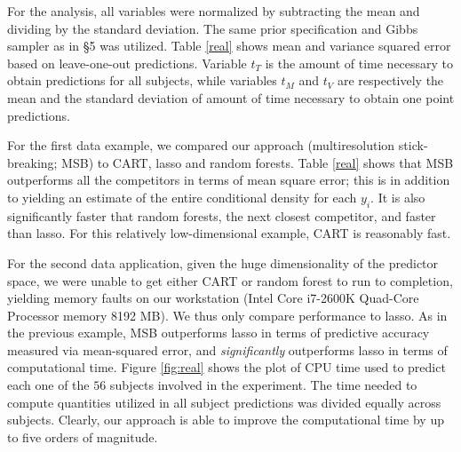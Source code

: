 \documentclass{article}
\begin{document}
For the analysis, all variables were normalized by subtracting the mean and dividing by the standard deviation. The same prior specification and Gibbs sampler as in \S 5 was  utilized. Table \ref{real} shows mean and variance squared error based on leave-one-out predictions. Variable $t_{T}$ is the amount of time necessary to obtain predictions for all subjects, while variables $t_M$ and $t_V$ are respectively the mean and the standard deviation of amount of time necessary to obtain one point predictions.

For the first data example, we compared our approach (multiresolution stick-breaking; MSB) to CART, lasso and random forests. 
Table \ref{real} shows that MSB outperforms all the competitors in terms of mean square error; this is in addition to yielding an estimate of the entire conditional density for each $y_i$.  It is also significantly faster that random forests, the next closest competitor, and faster than lasso.  For this relatively low-dimensional example, CART is reasonably fast.  

 
 For the second data application, given the huge dimensionality of the predictor space, we were unable to get either CART or random forest to run to completion, yielding memory faults on our workstation (Intel Core i7-2600K Quad-Core Processor memory 8192 MB).  We thus only compare performance to lasso.  As in the previous example, MSB outperforms lasso in terms of predictive accuracy measured via mean-squared error, and \emph{significantly} outperforms lasso in terms of computational time.  
Figure \ref{fig:real} shows the plot of CPU time used to predict each one of the $56$ subjects involved in the experiment. The time needed to compute quantities utilized in all subject predictions was divided equally across subjects. Clearly, our approach is able to improve the computational time by up to five orders of magnitude. 
\end{document}
